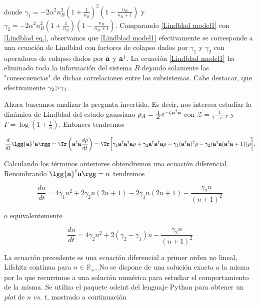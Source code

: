 donde $\gamma_1 = -2\alpha^2n_B^2\left(1+\frac{1}{n_B}\right)^2\left(1-\frac{n_B}{n_B+1}\right)$ y $\gamma_2 = -2\alpha^2n_B^2\left(1+\frac{1}{n_B}\right)\left(1-\frac{n_B}{n_B+1}\right)$. Comparando \eqref{Lindblad model1} con \eqref{Lindblad eq.}, observamos que \eqref{Lindblad model1} efectivamente se corresponde a una ecuación de Lindblad con factores de colapso dados por $\gamma_1$ y $\gamma_2$ con operadores de colapso dados por ${\bf a}$ y ${\bf a}^{\dagger}$. La ecuación \eqref{Lindblad model1} ha eliminado toda la información del sistema $B$ dejando solamente las "consecuencias" de dichas correlaciones entre los subsistemas. Cabe destacar, que efectivamente $\gamma_2 \mbox{\textgreater} \gamma_1$. 

Ahora buscamos analizar la pregunta invertida. Es decir, nos interesa estudiar la dinámica de Lindblad del estado gaussiano $\rho_{A} = \frac{1}{\mathcal{Z}} e^{-\zeta {\bf a}^{\dagger} {\bf a}}$ con $\mathcal{Z} = \frac{1}{1-e^{-\Gamma}}$ y $\Gamma= \log\left(1+\frac{1}{n}\right)$. Entonces tendremos

\begin{align}
    \frac{d}{dt} \lgg {\bf a}^{\dagger}{\bf a} \rgg = \Tr \left({\bf a}^{\dagger}{\bf a}\frac{d\rho}{dt}\right)
    = \Tr \bigg[\gamma_1 {\bf a}^{\dagger}{\bf a}^{\dagger}{\bf a}\rho+ \gamma_2{\bf a}^{\dagger}{\bf a}^{\dagger}{\bf a}\rho - \gamma_1 ({\bf a}^{\dagger}{\bf a})^2 \rho - \gamma_2 ({\bf a}^{\dagger}{\bf a}({\bf a}^{\dagger}{\bf a}+1))\rho\bigg].
\end{align}

Calculando los términos anteriores obtendremos una ecuación diferencial. Renombrando $\lgg {\bf a}^{\dagger}{\bf a} \rgg = n$ tendremos 

\begin{equation}
    \frac{dn}{dt}= 4\gamma_1 n^2 + 2\gamma_2 n(2n+1) - 2\gamma_1 n(2n+1)-\frac{\gamma_2n}{(n+1)^2}
\end{equation}

o equivalentemente 

\begin{equation}
    \frac{dn}{dt}= 4\gamma_2 n^2 + 2(\gamma_2 - \gamma_1) n - \frac{\gamma_2 n}{(n+1)^2}
    \label{eq:dif_model1}
\end{equation}

La ecuación precedente es una ecuación diferencial a primer orden no lineal, Lifshitz continua para $n \in \mathds{R}_{+}$. No se dispone de una solución exacta a la misma por lo que recurrimos a una solución numérica para estudiar el comportamiento de la misma. Se utiliza el paquete odeint del lenguaje Python para obtener un \textit{plot} de $n$ $vs$. $t$, mostrado a continuación

